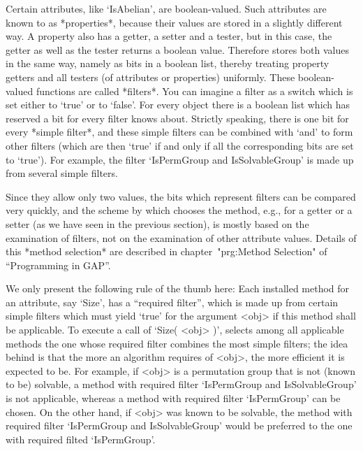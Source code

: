 \null

%
%
Certain attributes, like `IsAbelian', are boolean-valued. Such attributes
are known to {\GAP} as *properties*, because their values are stored in a
slightly different way.   A property also  has a  getter, a  setter and a
tester, but  in this case,  the  getter as well  as the  tester returns a
boolean value. Therefore {\GAP}  stores   both values  in the same   way,
namely as bits  in a boolean  list, thereby treating property getters and
all testers (of attributes or properties) uniformly. These boolean-valued
functions  are called  *filters*.  You can imagine  a filter  as a switch
which is  set either  to `true' or  to `false'.  For every  {\GAP} object
there is a boolean list which has reserved a  bit for every filter {\GAP}
knows  about. Strictly speaking, there   is one bit for every  *simple
filter*, and these  simple filters can be  combined with `and' to form
other filters (which are then `true' if and only if all the corresponding
bits are set to `true').
For example, the filter `IsPermGroup and IsSolvableGroup' is made up from
several simple filters.

Since they allow only two values, the bits which represent filters can be
compared very quickly, and the scheme by which {\GAP} chooses the method,
e.g., for a getter or a setter (as we have seen in the previous section),
is mostly based  on the examination of filters,  not on the examination
of other  attribute   values. Details  of   this *method selection*   are
described in chapter~"prg:Method Selection" of ``Programming in GAP''.

We  only present the following  rule  of the  thumb here:
Each installed method for an attribute, say `Size',
has a ``required filter'', which is made  up from certain simple filters
which must yield `true' for the argument <obj> if this method shall be
applicable.
To execute a call of `Size( <obj> )', {\GAP} selects among all applicable
methods the one whose required filter combines the most simple filters;
the idea behind is that the more an algorithm requires of <obj>,
the more efficient it is expected to be.
For example, if <obj> is a permutation group that is not (known to be)
solvable,
a method  with required filter `IsPermGroup and IsSolvableGroup' is not
applicable, whereas a method with required filter `IsPermGroup' can be
chosen.
On the other hand, if <obj> was  known to be solvable,
the method with required filter `IsPermGroup and IsSolvableGroup'
would be preferred to the one with required filted `IsPermGroup'.

